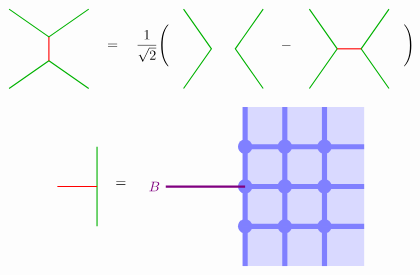 \documentclass[report,paper=a4, fontsize=12pt, line_length=16cm, number_of_lines=33,dvipdfmx]{jlreq}
\numberwithin{equation}{chapter}
\begin{document}
\begin{align}
    \begin{tikzpicture}[baseline=0]
        \coordinate(A) at (-1,-1);
        \coordinate(B) at (1,-1);
        \coordinate(C) at (1,1);
        \coordinate(D) at (-1,1);
        \draw[darkgreen,thick] (D)--(0,0.3)--(C);
        \draw[darkgreen,thick] (A)--(0,-0.3)--(B);
        \draw[red,thick] (0,0.3)--(0,-0.3);
    \end{tikzpicture}
    \quad=\quad \frac{1}{\sqrt{2}}\Bigg(
    \quad
    \begin{tikzpicture}[baseline=0]
        \coordinate(A) at (-1,-1);
        \coordinate(B) at (1,-1);
        \coordinate(C) at (1,1);
        \coordinate(D) at (-1,1);
        \draw[darkgreen,thick] (D)--(-0.3,0)--(A);
        \draw[darkgreen,thick] (C)--(0.3,0)--(B);
    \end{tikzpicture}
    \quad
    -
    \quad
    \begin{tikzpicture}[baseline=0]
        \coordinate(A) at (-1,-1);
        \coordinate(B) at (1,-1);
        \coordinate(C) at (1,1);
        \coordinate(D) at (-1,1);
        \draw[darkgreen,thick] (D)--(-0.3,0)--(A);
        \draw[darkgreen,thick] (C)--(0.3,0)--(B);
        \draw[red,thick] (0.3,0)--(-0.3,0);
    \end{tikzpicture}
    \quad
    \Bigg)
\end{align}


\begin{align}
    \begin{tikzpicture}[baseline=0]
        \draw[darkgreen,thick] (0,1)--(0,-1);
        \draw[red,thick] (-1,0)--(0,0);
    \end{tikzpicture}
    \quad
    =\quad
    \begin{tikzpicture}[baseline=0cm]
        \foreach \x in {0,1,2}{
            \foreach \y in {-2,-1,...,1}{
            \fill[plaqblue](\x,\y) rectangle (\x+1,\y+1);
            }
        }
        \foreach \x in {0,1,2}{
            \foreach \y in {-1,0,1}{
                \fill[linkblue] (\x,\y) circle (1.8mm);
            }
        }
        \foreach \x in {0,1,2}{
            \foreach \y in {-1,0,1}{
                \draw[linkblue, line width = 1.3mm](\x,\y)--(\x + 1,\y);
            }
        }
        \foreach \x in {0,1,2}{
            \foreach \y in {-2,-1,...,1}{
                \draw[linkblue, line width = 1.3mm](\x,\y)--(\x,\y + 1);
            }
        }
        \draw[red!50!blue, ultra thick](0,0)--(-2,0) node[left]{$B$};
    \end{tikzpicture}        
\end{align}
\end{document}

